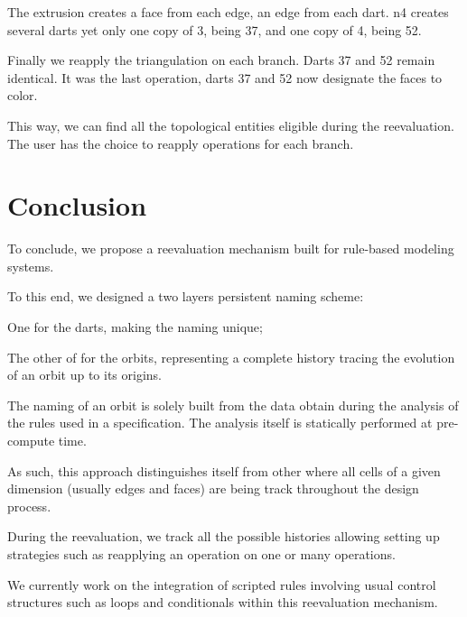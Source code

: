 \documentclass[11pt]{article}
\begin{document}
The extrusion creates a face from each edge, an edge from each dart. %
n4 creates several darts yet only one copy of 3, being 37, and one copy of 4,
being 52.

Finally we reapply the triangulation on each branch. %
Darts 37 and 52 remain identical. %
It was the last operation, darts 37 and 52 now designate the faces to color. %

This way, we can find all the topological entities eligible during the
reevaluation. %
The user has the choice to reapply operations for each branch. %

\section{Conclusion}
\label{sec:orga7a7cfd}

To conclude, we propose a reevaluation mechanism built for rule-based
modeling systems.

To this end, we designed a two layers persistent naming scheme:

One for the darts, making the naming unique;

The other of for the orbits, representing a complete history tracing the
evolution of an orbit up to its origins.

The naming of an orbit is solely built from the data obtain during the analysis of
the rules used in a specification. The analysis itself is statically performed
at pre-compute time.

As such, this approach distinguishes itself from other where all cells of a given
dimension (usually edges and faces) are being track throughout the design process.

During the reevaluation, we track all the possible histories allowing setting up strategies such as reapplying an operation on one or many operations.

We currently work on the integration of scripted rules involving usual control
structures such as loops and conditionals within this reevaluation mechanism.
\end{document}
